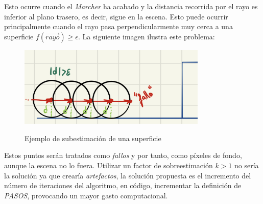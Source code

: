 Esto ocurre cuando el \textit{Marcher} ha acabado y la distancia recorrida por el rayo es inferior al plano trasero, es decir, sigue en la escena. Esto puede ocurrir principalmente cuando el rayo pasa perpendicularmente muy cerca a una superficie \(f(\Vec{rayo}) \ge \epsilon\). La siguiente imagen ilustra este problema:

\begin{figure}[H]
  \centering
  \captionsetup{justification=centering}%
  \includegraphics[width=0.8\textwidth]{secciones/imagenes/subestimacion.jpeg}\label{fig:subestimacion}
  \caption{Ejemplo de subestimación de una superficie}
\end{figure}

Estos puntos serán tratados como \textit{fallos} y por tanto, como píxeles de fondo, aunque la escena no lo fuera. Utilizar un factor de sobreestimación \(k > 1\) no sería la solución ya que crearía \textit{artefactos}, la solución propuesta es el incremento del número de iteraciones del algoritmo, en código, incrementar la definición de \textit{PASOS}, provocando un mayor gasto computacional.